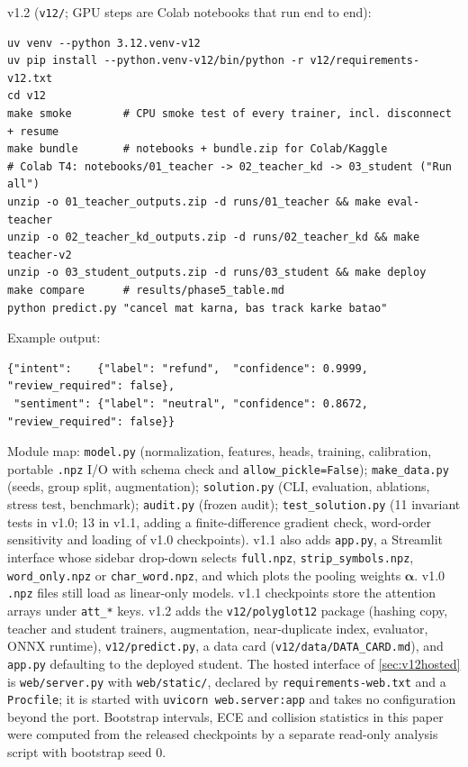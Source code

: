 \documentclass[11pt,a4paper]{article}
\theoremstyle{remark}
\begin{document}
\noindent v1.2 (\texttt{v12/}; GPU steps are Colab notebooks that run end to end):
\begin{lstlisting}
uv venv --python 3.12.venv-v12
uv pip install --python.venv-v12/bin/python -r v12/requirements-v12.txt
cd v12
make smoke        # CPU smoke test of every trainer, incl. disconnect + resume
make bundle       # notebooks + bundle.zip for Colab/Kaggle
# Colab T4: notebooks/01_teacher -> 02_teacher_kd -> 03_student ("Run all")
unzip -o 01_teacher_outputs.zip -d runs/01_teacher && make eval-teacher
unzip -o 02_teacher_kd_outputs.zip -d runs/02_teacher_kd && make teacher-v2
unzip -o 03_student_outputs.zip -d runs/03_student && make deploy
make compare      # results/phase5_table.md
python predict.py "cancel mat karna, bas track karke batao"
\end{lstlisting}

\noindent Example output:
\begin{lstlisting}
{"intent":    {"label": "refund",  "confidence": 0.9999, "review_required": false},
 "sentiment": {"label": "neutral", "confidence": 0.8672, "review_required": false}}
\end{lstlisting}

\noindent Module map: \texttt{model.py} (normalization, features, heads,
training, calibration, portable \texttt{.npz} I/O with schema check and
\texttt{allow\_pickle=False}); \texttt{make\_data.py} (seeds, group split,
augmentation); \texttt{solution.py} (CLI, evaluation, ablations, stress test,
benchmark); \texttt{audit.py} (frozen audit); \texttt{test\_solution.py}
(11 invariant tests in v1.0; 13 in v1.1, adding a finite-difference gradient
check, word-order sensitivity and loading of v1.0 checkpoints). v1.1 also adds
\texttt{app.py}, a Streamlit interface whose sidebar drop-down selects
\texttt{full.npz}, \texttt{strip\_symbols.npz}, \texttt{word\_only.npz} or
\texttt{char\_word.npz}, and which plots the pooling weights $\bm\alpha$.
v1.0 \texttt{.npz} files still load as linear-only models. v1.1 checkpoints
store the attention arrays under \texttt{att\_*} keys. v1.2 adds the
\texttt{v12/polyglot12} package (hashing copy, teacher and student trainers,
augmentation, near-duplicate index, evaluator, ONNX runtime),
\texttt{v12/predict.py}, a data card (\texttt{v12/data/DATA\_CARD.md}), and
\texttt{app.py} defaulting to the deployed student. The hosted interface of
\cref{sec:v12hosted} is \texttt{web/server.py} with \texttt{web/static/},
declared by \texttt{requirements-web.txt} and a \texttt{Procfile}; it is
started with \texttt{uvicorn web.server:app} and takes no configuration
beyond the port. Bootstrap intervals, ECE and collision statistics in
this paper were computed from the released checkpoints by a separate
read-only analysis script with bootstrap seed 0.
\end{document}
